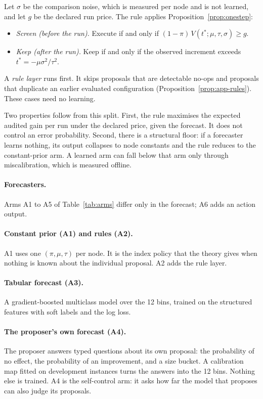 Let $\sigma$ be the comparison noise, which is measured per node and is not learned, and let $g$ be the declared run price. The rule applies Proposition~\ref{prop:onestep}:
\begin{itemize}
\item \emph{Screen (before the run).} Execute if and only if $(1-\pi)\,V(t^*;\mu,\tau,\sigma)\ge g$.
\item \emph{Keep (after the run).} Keep if and only if the observed increment exceeds $t^*=-\mu\sigma^2/\tau^2$.
\end{itemize}
A \emph{rule layer} runs first. It skips proposals that are detectable no-ops and proposals that duplicate an earlier evaluated configuration (Proposition~\ref{prop:app-rules}). These cases need no learning.

Two properties follow from this split. First, the rule maximises the expected audited gain per run under the declared price, given the forecast. It does not control an error probability. Second, there is a structural floor: if a forecaster learns nothing, its output collapses to node constants and the rule reduces to the constant-prior arm. A learned arm can fall below that arm only through miscalibration, which is measured offline.

\paragraph{Forecasters.}

Arms A1 to A5 of Table~\ref{tab:arms} differ only in the forecast; A6 adds an action output.

\paragraph{Constant prior (A1) and rules (A2).}
A1 uses one $(\pi,\mu,\tau)$ per node. It is the index policy that the theory gives when nothing is known about the individual proposal. A2 adds the rule layer.

\paragraph{Tabular forecast (A3).}
A gradient-boosted multiclass model \citep{ke2017lightgbm} over the 12 bins, trained on the structured features with soft labels and the log loss.

\paragraph{The proposer's own forecast (A4).}
The proposer answers typed questions about its own proposal: the probability of no effect, the probability of an improvement, and a size bucket. A calibration map fitted on development instances turns the answers into the 12 bins. Nothing else is trained. A4 is the self-control arm: it asks how far the model that proposes can also judge its proposals.

